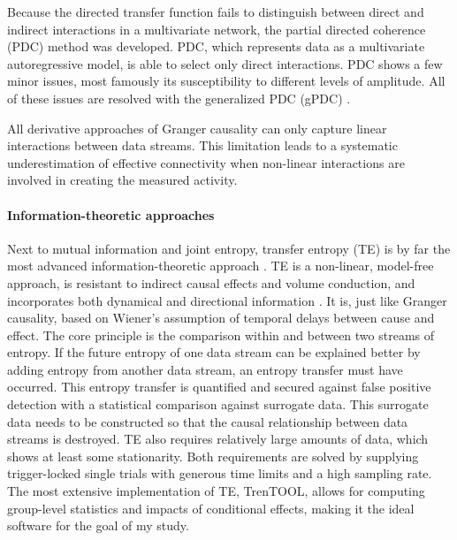 Because the directed transfer function fails to distinguish between direct and indirect interactions in a multivariate network, the partial directed coherence (PDC) method was developed.
PDC, which represents data as a multivariate autoregressive model, is able to select only direct interactions.
PDC shows a few minor issues, most famously its susceptibility to different levels of amplitude.
All of these issues are resolved with the generalized PDC (gPDC) \cite{1.5.gPDC}.

All derivative approaches of Granger causality can only capture linear interactions between data streams.
This limitation leads to a systematic underestimation of effective connectivity when non-linear interactions are involved in creating the measured activity.

\paragraph{Information-theoretic approaches}
Next to mutual information and joint entropy, transfer entropy (TE) is by far the most advanced information-theoretic approach \cite{1.5.TEcomparison}.
TE is a non-linear, model-free approach, is resistant to indirect causal effects and volume conduction, and incorporates both dynamical and directional information \cite{3.4.TE}.
It is, just like Granger causality, based on Wiener's assumption of temporal delays between cause and effect.
The core principle is the comparison within and between two streams of entropy.
If the future entropy of one data stream can be explained better by adding entropy from another data stream, an entropy transfer must have occurred.
This entropy transfer is quantified and secured against false positive detection with a statistical comparison against surrogate data.
This surrogate data needs to be constructed so that the causal relationship between data streams is destroyed.
TE also requires relatively large amounts of data, which shows at least some stationarity.
Both requirements are solved by supplying trigger-locked single trials with generous time limits and a high sampling rate.
The most extensive implementation of TE, TrenTOOL, allows for computing group-level statistics and impacts of conditional effects, making it the ideal software for the goal of my study.